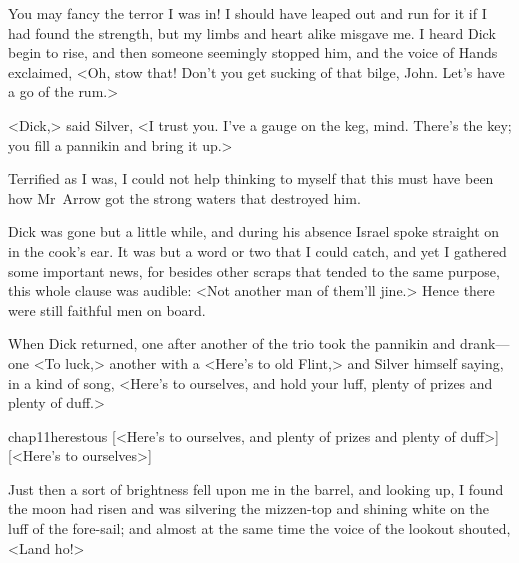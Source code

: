 You may fancy the terror I was in! I should have leaped out and run for it if I had found the strength, but my limbs and heart alike misgave me. I heard Dick begin to rise, and then someone seemingly stopped him, and the voice of Hands exclaimed, <Oh, stow that! Don't you get sucking of that bilge, John. Let's have a go of the rum.>

<Dick,> said Silver, <I trust you. I've a gauge on the keg, mind. There's the key; you fill a pannikin and bring it up.>

Terrified as I was, I could not help thinking to myself that this must have been how Mr~Arrow got the strong waters that destroyed him.

Dick was gone but a little while, and during his absence Israel spoke straight on in the cook's ear. It was but a word or two that I could catch, and yet I gathered some important news, for besides other scraps that tended to the same purpose, this whole clause was audible: <Not another man of them'll jine.> Hence there were still faithful men on board.

When Dick returned, one after another of the trio took the pannikin and drank—one <To luck,> another with a <Here's to old Flint,> and Silver himself saying, in a kind of song, <Here's to ourselves, and hold your luff, plenty of prizes and plenty of duff.>

\begin{bwbigpic}
	[\basicscale]
	{chap11herestous}
	[<Here's to ourselves, and plenty of prizes and plenty of duff>]
	[<Here's to ourselves>]
\end{bwbigpic}

Just then a sort of brightness fell upon me in the barrel, and looking up, I found the moon had risen and was silvering the mizzen-top and shining white on the luff of the fore-sail; and almost at the same time the voice of the lookout shouted, <Land ho!>
